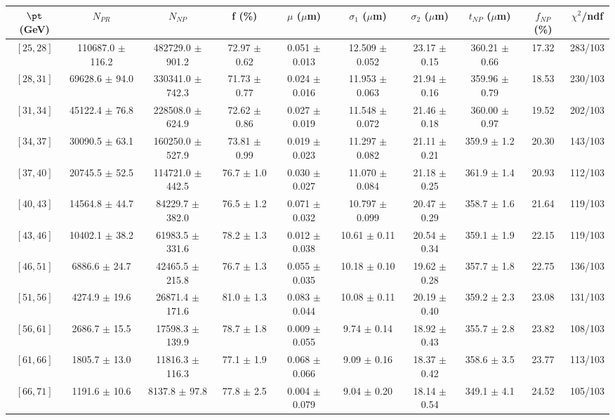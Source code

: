 \begin{tabular}{c||c|c|c|c|c|c|c||c|c}
$\pt$ (GeV) & $N_{PR}$ & $N_{NP}$ & f (\%) & $\mu$ ($\mu$m) & $\sigma_1$ ($\mu$m) & $\sigma_2$ ($\mu$m)  & $t_{NP}$ ($\mu$m) & $f_{NP}$ (\%) & $\chi^2$/ndf \\
\hline
$[25, 28]$ & 110687.0 $\pm$ 116.2 & 482729.0 $\pm$ 901.2 & 72.97 $\pm$ 0.62 & 0.051 $\pm$ 0.013 & 12.509 $\pm$ 0.052 & 23.17 $\pm$ 0.15 & 360.21 $\pm$ 0.66 & 17.32 & 283/103\\
$[28, 31]$ & 69628.6 $\pm$ 94.0 & 330341.0 $\pm$ 742.3 & 71.73 $\pm$ 0.77 & 0.024 $\pm$ 0.016 & 11.953 $\pm$ 0.063 & 21.94 $\pm$ 0.16 & 359.96 $\pm$ 0.79 & 18.53 & 230/103\\
$[31, 34]$ & 45122.4 $\pm$ 76.8 & 228508.0 $\pm$ 624.9 & 72.62 $\pm$ 0.86 & 0.027 $\pm$ 0.019 & 11.548 $\pm$ 0.072 & 21.46 $\pm$ 0.18 & 360.00 $\pm$ 0.97 & 19.52 & 202/103\\
$[34, 37]$ & 30090.5 $\pm$ 63.1 & 160250.0 $\pm$ 527.9 & 73.81 $\pm$ 0.99 & 0.019 $\pm$ 0.023 & 11.297 $\pm$ 0.082 & 21.11 $\pm$ 0.21 & 359.9 $\pm$ 1.2 & 20.30 & 143/103\\
$[37, 40]$ & 20745.5 $\pm$ 52.5 & 114721.0 $\pm$ 442.5 & 76.7 $\pm$ 1.0 & 0.030 $\pm$ 0.027 & 11.070 $\pm$ 0.084 & 21.18 $\pm$ 0.25 & 361.9 $\pm$ 1.4 & 20.93 & 112/103\\
$[40, 43]$ & 14564.8 $\pm$ 44.7 & 84229.7 $\pm$ 382.0 & 76.5 $\pm$ 1.2 & 0.071 $\pm$ 0.032 & 10.797 $\pm$ 0.099 & 20.47 $\pm$ 0.29 & 358.7 $\pm$ 1.6 & 21.64 & 119/103\\
$[43, 46]$ & 10402.1 $\pm$ 38.2 & 61983.5 $\pm$ 331.6 & 78.2 $\pm$ 1.3 & 0.012 $\pm$ 0.038 & 10.61 $\pm$ 0.11 & 20.54 $\pm$ 0.34 & 359.1 $\pm$ 1.9 & 22.15 & 119/103\\
$[46, 51]$ & 6886.6 $\pm$ 24.7 & 42465.5 $\pm$ 215.8 & 76.7 $\pm$ 1.3 & 0.055 $\pm$ 0.035 & 10.18 $\pm$ 0.10 & 19.62 $\pm$ 0.28 & 357.7 $\pm$ 1.8 & 22.75 & 136/103\\
$[51, 56]$ & 4274.9 $\pm$ 19.6 & 26871.4 $\pm$ 171.6 & 81.0 $\pm$ 1.3 & 0.083 $\pm$ 0.044 & 10.08 $\pm$ 0.11 & 20.19 $\pm$ 0.40 & 359.2 $\pm$ 2.3 & 23.08 & 131/103\\
$[56, 61]$ & 2686.7 $\pm$ 15.5 & 17598.3 $\pm$ 139.9 & 78.7 $\pm$ 1.8 & 0.009 $\pm$ 0.055 & 9.74 $\pm$ 0.14 & 18.92 $\pm$ 0.43 & 355.7 $\pm$ 2.8 & 23.82 & 108/103\\
$[61, 66]$ & 1805.7 $\pm$ 13.0 & 11816.3 $\pm$ 116.3 & 77.1 $\pm$ 1.9 & 0.068 $\pm$ 0.066 & 9.09 $\pm$ 0.16 & 18.37 $\pm$ 0.42 & 358.6 $\pm$ 3.5 & 23.77 & 113/103\\
$[66, 71]$ & 1191.6 $\pm$ 10.6 & 8137.8 $\pm$ 97.8 & 77.8 $\pm$ 2.5 & 0.004 $\pm$ 0.079 & 9.04 $\pm$ 0.20 & 18.14 $\pm$ 0.54 & 349.1 $\pm$ 4.1 & 24.52 & 105/103\\

\end{tabular}
